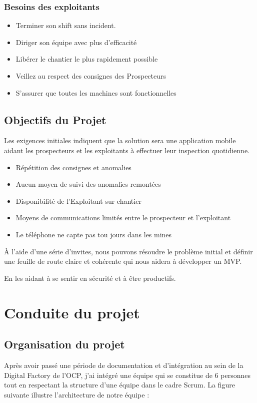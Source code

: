 \subsubsection{Besoins des exploitants}
\begin{itemize}
\item Terminer son shift sans incident.
\item Diriger son \'equipe avec plus d'efficacit\'e
\item Lib\'erer le chantier le plus rapidement possible
\item Veillez au respect des consignes des Prospecteurs
\item S'assurer que toutes les machines sont fonctionnelles
\end{itemize}

\subsection{Objectifs du Projet}

Les exigences initiales indiquent que la solution sera une application mobile aidant les prospecteurs et les exploitants \`a effectuer leur inspection quotidienne.

\begin{itemize}
\item R\'ep\'etition des consignes et anomalies
\item Aucun moyen de suivi des anomalies remont\'ees 
\item Disponibilit\'e de l'Exploitant sur chantier
\item Moyens de communications limit\'es entre le prospecteur et l'exploitant
\item Le t\'el\'ephone ne capte pas tou jours dans les mines 
\end{itemize}

\`A l'aide d'une s\'erie d'invites, nous pouvons r\'esoudre le probl\`eme initial et d\'efinir une feuille de route claire et coh\'erente qui nous aidera \`a d\'evelopper un MVP.

En les aidant \`a se sentir en s\'ecurit\'e et \`a \^etre productifs.

\section{Conduite du projet}
\subsection{Organisation du projet}
Apr\`es avoir pass\'e une p\'eriode de documentation et d'int\'egration au sein de la Digital Factory de l'OCP, j'ai int\'egr\'e une \'equipe qui se constitue de 6 personnes tout en respectant la structure d'une \'equipe dans le cadre Scrum.
La figure suivante illustre l'architecture de notre \'equipe :

